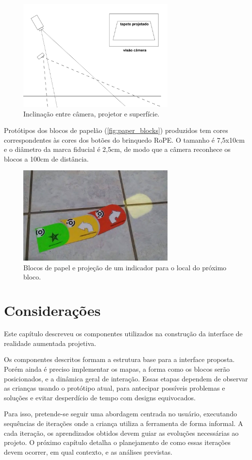 \begin{figure}[!htpb]
    \centering
    \includegraphics[width=0.7\textwidth, fbox]{figs/homography.png}
    \caption{Inclinação entre câmera, projetor e superfície.}
    \label{fig:homography}
\end{figure}

Protótipos dos blocos de papelão (\autoref{fig:paper_blocks}) produzidos tem cores correspondentes às cores dos botões do brinquedo RoPE. O tamanho é 7,5x10cm e o diâmetro da marca fiducial é 2,5cm, de modo que a câmera reconhece os blocos a 100cm de distância.

\begin{figure}[!htpb]
    \centering
    \includegraphics[width=0.7\textwidth, fbox]{figs/paper_blocks.png}
    \caption{Blocos de papel e projeção de um indicador para o local do próximo bloco.}
    \label{fig:paper_blocks}
\end{figure}

\section{Considerações}
Este capítulo descreveu os componentes utilizados na construção da interface de realidade aumentada projetiva. 

Os componentes descritos formam a estrutura base para a interface proposta. Porém ainda é preciso implementar os mapas, a forma como os blocos serão posicionados, e a dinâmica geral de interação. Essas etapas dependem de observar as crianças usando o protótipo atual, para antecipar possíveis problemas e soluções e evitar desperdício de tempo com designs equivocados.

Para isso, pretende-se seguir uma abordagem centrada no usuário, executando sequências de iterações onde a criança utiliza a ferramenta de forma informal. A cada iteração, os aprendizados obtidos devem guiar as evoluções necessárias ao projeto. O próximo capítulo detalha o planejamento de como essas iterações devem ocorrer, em qual contexto, e as análises previstas.
